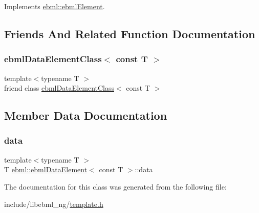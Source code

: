 Implements \mbox{\hyperlink{classebml_1_1ebmlElement_a7852173aeef78bd843939ae5a82f1d1c}{ebml\+::ebml\+Element}}.



\subsection{Friends And Related Function Documentation}
\mbox{\label{classebml_1_1ebmlDataElement_3_01const_01T_01_4_aea1d7162edf00e39cf37b106860abbcd}} 
\subsubsection{\texorpdfstring{ebml\+Data\+Element\+Class$<$ const T $>$}{ebmlDataElementClass< const T >}}
{\footnotesize\ttfamily template$<$typename T $>$ \\
friend class \mbox{\hyperlink{classebml_1_1ebmlDataElementClass}{ebml\+Data\+Element\+Class}}$<$ const T $>$\hspace{0.3cm}{\ttfamily [friend]}}



\subsection{Member Data Documentation}
\mbox{\label{classebml_1_1ebmlDataElement_3_01const_01T_01_4_ac3870bb3b5d9d0e3063a80768fe83904}} 
\subsubsection{\texorpdfstring{data}{data}}
{\footnotesize\ttfamily template$<$typename T $>$ \\
T \mbox{\hyperlink{classebml_1_1ebmlDataElement}{ebml\+::ebml\+Data\+Element}}$<$ const T $>$\+::data}



The documentation for this class was generated from the following file\+:\begin{DoxyCompactItemize}
\item 
include/libebml\+\_\+ng/\mbox{\hyperlink{template_8h}{template.\+h}}\end{DoxyCompactItemize}
